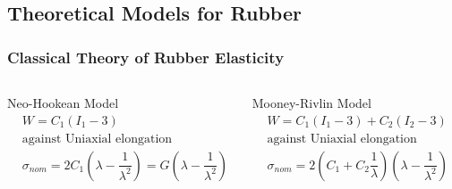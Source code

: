 \documentclass[12pt, dvipdfmx]{beamer}
\begin{document}
\subsection{Theoretical Models for Rubber}
\begin{frame}
    \frametitle{Classical Theory of Rubber Elasticity}
		\begin{columns}[T, onlytextwidth]
				\begin{exampleblock}{Neo-Hookean Model}
					\vspace{-2mm}
						\scriptsize
						\begin{align*}
							&W = C_1 (I_1-3) \\
							&\text{against Uniaxial elongation} \\
							&\sigma_{nom} = 2 C_1\left(\lambda - \dfrac{1}{\lambda^2}\right) = G \left(\lambda - \dfrac{1}{\lambda^2}\right)
						\end{align*}
				\end{exampleblock}
				\begin{alertblock}{Mooney-Rivlin Model}
					\vspace{-2mm}
					\scriptsize
					\begin{align*}
						&W = C_1 (I_1-3) + C_2(I_2-3) \\
						&\text{against Uniaxial elongation} \\
						&\sigma_{nom} = 2 \left(C_1 + C_2\dfrac{1}{\lambda} \right) \left(\lambda - \dfrac{1}{\lambda^2}\right)
					\end{align*}
				\end{alertblock}
		\end{columns}

\end{frame}
\end{document}
